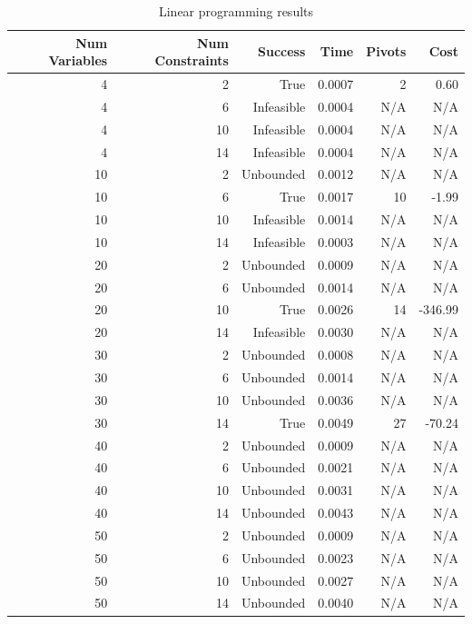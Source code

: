 \begin{table}[ht]
    \centering
    \begin{tabular}{rrrrrr}
        \toprule
        Num Variables & Num Constraints & Success & Time & Pivots & Cost \\
        \midrule
        4 & 2 & True & 0.0007 & 2 & 0.60 \\
		4 & 6 & Infeasible & 0.0004 & N/A & N/A \\
		4 & 10 & Infeasible & 0.0004 & N/A & N/A \\
		4 & 14 & Infeasible & 0.0004 & N/A & N/A \\
		10 & 2 & Unbounded & 0.0012 & N/A & N/A \\
		10 & 6 & True & 0.0017 & 10 & -1.99 \\
		10 & 10 & Infeasible & 0.0014 & N/A & N/A \\
		10 & 14 & Infeasible & 0.0003 & N/A & N/A \\
		20 & 2 & Unbounded & 0.0009 & N/A & N/A \\
		20 & 6 & Unbounded & 0.0014 & N/A & N/A \\
		20 & 10 & True & 0.0026 & 14 & -346.99 \\
		20 & 14 & Infeasible & 0.0030 & N/A & N/A \\
		30 & 2 & Unbounded & 0.0008 & N/A & N/A \\
		30 & 6 & Unbounded & 0.0014 & N/A & N/A \\
		30 & 10 & Unbounded & 0.0036 & N/A & N/A \\
		30 & 14 & True & 0.0049 & 27 & -70.24 \\
		40 & 2 & Unbounded & 0.0009 & N/A & N/A \\
		40 & 6 & Unbounded & 0.0021 & N/A & N/A \\
		40 & 10 & Unbounded & 0.0031 & N/A & N/A \\
		40 & 14 & Unbounded & 0.0043 & N/A & N/A \\
		50 & 2 & Unbounded & 0.0009 & N/A & N/A \\
		50 & 6 & Unbounded & 0.0023 & N/A & N/A \\
		50 & 10 & Unbounded & 0.0027 & N/A & N/A \\
		50 & 14 & Unbounded & 0.0040 & N/A & N/A \\
        \bottomrule
    \end{tabular}
    \caption{Linear programming results}
    \label{tab:lp-results}
\end{table}